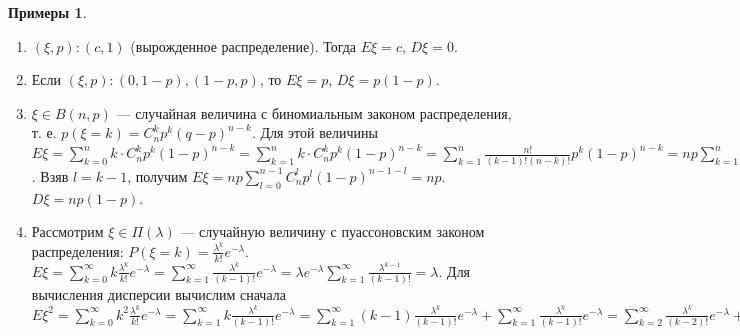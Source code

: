 \documentclass[11pt,openany,a4paper]{scrartcl}
\theoremstyle{plain}
\theoremstyle{definition}
\newtheorem{examples}[theorem]{Примеры}
\begin{document}
\begin{examples}
    \begin{enumerate}
        \item $(\xi, p): (c, 1)$ (вырожденное распределение). Тогда $E\xi = c$,
        $D\xi = 0$.
        \item Если $(\xi, p): (0, 1-p), (1-p, p)$, то $E\xi = p$, $D\xi = p(1-p)$.
        \item $\xi \in B(n, p)$ — случайная величина с биномиальным законом
        распределения, т. е. $p(\xi = k) = C_n^kp^k(q-p)^{n-k}$. Для этой величины
        $E\xi = \sum\limits_{k=0}^n k\cdot C_n^kp^k(1-p)^{n-k} =
        \sum\limits_{k=1}^n k\cdot C_n^kp^k(1-p)^{n-k} =
        \sum\limits_{k=1}^n \frac{n!}{(k-1)!(n-k)!}p^k(1-p)^{n-k} =
        np\sum\limits_{k=1}^n \frac{(n-1)!}{(k-1)!(n-1-(k-1))!}
        p^{k-1}(1-p)^{n-1-(k-1)}$. Взяв $l = k-1$, получим
        $E\xi = np\sum\limits_{l=0}^{n-1} C_n^l p^l(1-p)^{n-1 - l} = np$.
        $D\xi = np(1-p)$.
        \item Рассмотрим $\xi \in \Pi(\lambda)$ — случайную величину с 
        пуассоновским законом распределения: $P(\xi = k) =
        \frac{\lambda^k}{k!}e^{-\lambda}$.
        $E\xi = \sum\limits_{k=0}^\infty k\frac{\lambda^k}{k!}e^{-\lambda} =
        \sum\limits_{k=1}^\infty \frac{\lambda^k}{(k-1)!}e^{-\lambda} =
        \lambda e^{-\lambda}\sum\limits_{k=1}^\infty
        \frac{\lambda^{k-1}}{(k-1)!} =
        \lambda$. Для вычисления дисперсии вычислим сначала
        $E\xi^2 = \sum\limits_{k=0}^\infty k^2\frac{\lambda^k}{k!}e^{-\lambda} =
        \sum\limits_{k=1}^\infty k\frac{\lambda^k}{(k-1)!}e^{-\lambda} =
        \sum\limits_{k=1}^\infty (k-1)\frac{\lambda^k}{(k-1)!}e^{-\lambda} +
        \sum\limits_{k=1}^\infty\frac{\lambda^k}{(k-1)!}e^{-\lambda} =
        \sum\limits_{k=2}^\infty \frac{\lambda^k}{(k-2)!}e^{-\lambda} +
        \lambda e^{-\lambda}
        \sum\limits_{k=1}^\infty \frac{\lambda^{k-1}}{(k-1)!} =
        \lambda^2 e^{-\lambda}
        \sum\limits_{k=2}^\infty\frac{\lambda^{k-2}}{(k-2)!}$
        

\end{enumerate}
\end{examples}
\end{document}
